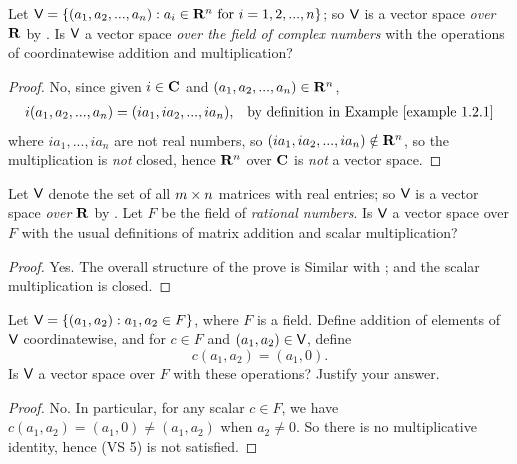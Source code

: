 \begin{exercise} \label{exercise 1.2.15}
Let \(\textsf{V} = \{ (a_1, a_2, ..., a_n): a_i \in \mathbf{R}^n \text{ for } i = 1, 2, ..., n \}\);
so \(\textsf{V}\) is a vector space \emph{over} \(\mathbf{R}\) by .
Is \(\textsf{V}\) a vector space \emph{over the field of complex numbers} with the operations of coordinatewise addition and
multiplication?
\end{exercise}

\begin{proof}
No, since given \(i \in \mathbf{C}\) and \((a_1, a_2, ..., a_n) \in \mathbf{R}^n\),
\begin{align*}
    i (a_1, a_2, ..., a_n) & = (i a_1, i a_2, ..., i a_n), & \text{by definition in \EXAMPLE{1.2.1}}
\end{align*}
where \(i a_1, ..., i a_n\) are not real numbers, so \((i a_1, i a_2, ..., i a_n) \notin \mathbf{R}^n\), so the multiplication is \emph{not} closed, hence \(\mathbf{R}^n\) over \(\mathbf{C}\) is \emph{not} a vector space.
\end{proof}

\begin{exercise} \label{exercise 1.2.16}
Let \(\textsf{V}\) denote the set of all \(m \times n\) matrices with real entries;
so \(\textsf{V}\) is a vector space \emph{over} \(\mathbf{R}\) by .
Let \(F\) be the field of \emph{rational numbers}.
Is \(\textsf{V}\) a vector space over \(F\) with the usual definitions of matrix addition and scalar multiplication?
\end{exercise}

\begin{proof}
Yes.
The overall structure of the prove is Similar with ;
and the scalar multiplication is closed.
\end{proof}

\begin{exercise} \label{exercise 1.2.17}
Let \(\textsf{V} = \{ (a_1, a_2) : a_1, a_2 \in F \}\), where \(F\) is a field.
Define addition of elements of \(\textsf{V}\) coordinatewise, and for \(c \in F\) and \((a_1, a_2) \in \textsf{V}\), define
\[
    c(a_1, a_2) = (a_1, 0).
\]
Is \(\textsf{V}\) a vector space over \(F\) with these operations? Justify your answer.
\end{exercise}

\begin{proof}
No.
In particular, for any scalar \(c \in F\), we have \(c(a_1, a_2) = (a_1, 0) \ne (a_1, a_2)\) when \(a_2 \ne 0\).
So there is no multiplicative identity, hence (VS 5) is not satisfied.
\end{proof}

